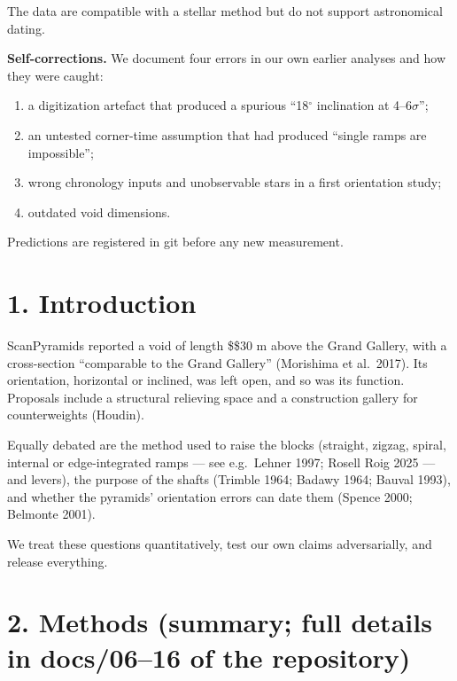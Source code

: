 \documentclass[
  11pt,
]{article}
\providecommand{\tightlist}{%
  \setlength{\itemsep}{0pt}\setlength{\parskip}{0pt}}
\begin{document}
The data are compatible with a stellar method but do not support
astronomical dating.

\textbf{Self-corrections.} We document four errors in our own earlier
analyses and how they were caught:

\begin{enumerate}
\def\labelenumi{\arabic{enumi}.}
\tightlist
\item
  a digitization artefact that produced a spurious ``18\(^\circ\)
  inclination at 4--6\(\sigma\)'';
\item
  an untested corner-time assumption that had produced ``single ramps
  are impossible'';
\item
  wrong chronology inputs and unobservable stars in a first orientation
  study;
\item
  outdated void dimensions.
\end{enumerate}

Predictions are registered in git before any new measurement.

\hypertarget{introduction}{%
\section{1. Introduction}\label{introduction}}

ScanPyramids reported a void of length \$\geq\$30 m above the Grand
Gallery, with a cross-section ``comparable to the Grand Gallery''
(Morishima et al.~2017). Its orientation, horizontal or inclined, was
left open, and so was its function. Proposals include a structural
relieving space and a construction gallery for counterweights (Houdin).

Equally debated are the method used to raise the blocks (straight,
zigzag, spiral, internal or edge-integrated ramps --- see e.g.~Lehner
1997; Rosell Roig 2025 --- and levers), the purpose of the shafts
(Trimble 1964; Badawy 1964; Bauval 1993), and whether the pyramids'
orientation errors can date them (Spence 2000; Belmonte 2001).

We treat these questions quantitatively, test our own claims
adversarially, and release everything.

\hypertarget{methods-summary-full-details-in-docs0616-of-the-repository}{%
\section{2. Methods (summary; full details in docs/06--16 of the
repository)}\label{methods-summary-full-details-in-docs0616-of-the-repository}}
\end{document}
